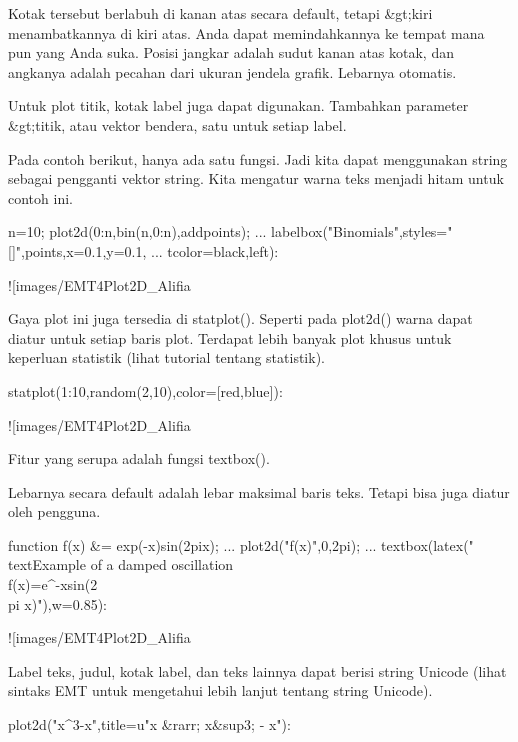 \documentclass{article}
\begin{document}
Kotak tersebut berlabuh di kanan atas secara default, tetapi &gt;kiri
menambatkannya di kiri atas. Anda dapat memindahkannya ke tempat mana
pun yang Anda suka. Posisi jangkar adalah sudut kanan atas kotak, dan
angkanya adalah pecahan dari ukuran jendela grafik. Lebarnya otomatis.


Untuk plot titik, kotak label juga dapat digunakan. Tambahkan
parameter &gt;titik, atau vektor bendera, satu untuk setiap label.


Pada contoh berikut, hanya ada satu fungsi. Jadi kita dapat
menggunakan string sebagai pengganti vektor string. Kita mengatur
warna teks menjadi hitam untuk contoh ini.


\>n=10; plot2d(0:n,bin(n,0:n),\>addpoints); ...  
\>   labelbox("Binomials",styles="[]",\>points,x=0.1,y=0.1, ...  
\>   tcolor=black,\>left):


![images/EMT4Plot2D_Alifia%

Gaya plot ini juga tersedia di statplot(). Seperti pada plot2d() warna
dapat diatur untuk setiap baris plot. Terdapat lebih banyak plot
khusus untuk keperluan statistik (lihat tutorial tentang statistik).


\>statplot(1:10,random(2,10),color=[red,blue]):


![images/EMT4Plot2D_Alifia%

Fitur yang serupa adalah fungsi textbox().


Lebarnya secara default adalah lebar maksimal baris teks. Tetapi bisa
juga diatur oleh pengguna.


\>function f(x) &= exp(-x)\*sin(2\*pi\*x); ...  
\>   plot2d("f(x)",0,2pi); ...  
\>   textbox(latex("\\text{Example of a damped oscillation}\\ f(x)=e^{-x}sin(2\\pi x)"),w=0.85):


![images/EMT4Plot2D_Alifia%

Label teks, judul, kotak label, dan teks lainnya dapat berisi string
Unicode (lihat sintaks EMT untuk mengetahui lebih lanjut tentang
string Unicode).


\>plot2d("x^3-x",title=u"x &rarr; x&sup3; - x"):
\end{document}
